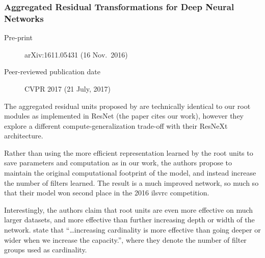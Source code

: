 \documentclass[thesis]{subfiles}
\begin{document}


\subsubsection*{Aggregated Residual Transformations for Deep Neural Networks}
\begin{description}
    \item[Pre-print] arXiv:1611.05431 (16 Nov.\ 2016)
    \item[Peer-reviewed publication date] CVPR 2017 (21 July, 2017)
\end{description}
The aggregated residual units proposed by \citet{saining2017} are technically identical to our root modules as implemented in ResNet (the paper cites our work), however they explore a different compute-generalization trade-off with their ResNeXt architecture. 

Rather than using the more efficient representation learned by the root units to save parameters and computation as in our work, the authors propose to maintain the original computational footprint of the model, and instead increase the number of filters learned. The result is a much improved network, so much so that their model won second place in the 2016 \gls{ilsvrc} competition. 

Interestingly, the authors claim that root units are even more effective on much larger datasets, and more effective than further increasing depth or width of the network. \citet{saining2017} state that ``\ldots increasing cardinality is more effective than going deeper or wider when we increase the capacity.'', where they denote the number of filter groups used as cardinality.
\end{document}
